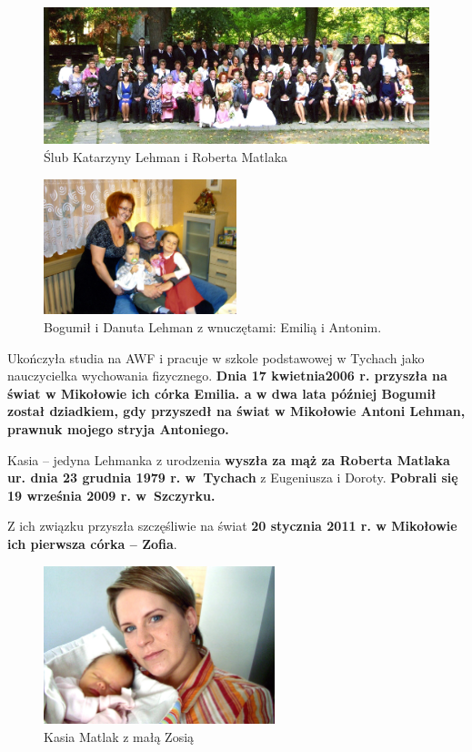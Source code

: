 \begin{figure}
\begin{center}
\includegraphics[width=240mm]{photo/katarzyna_robert_matlak_slub_2.jpg}
\caption{Ślub Katarzyny Lehman i Roberta Matlaka}
\end{center}
\end{figure}

\begin{figure}[!h]
\begin{center}
\includegraphics[width=0.5\textwidth]{photo/bogumil_danuta_lehman_z_wnukami.jpg}
\caption{Bogumił i Danuta Lehman z wnuczętami: Emilią i Antonim.}
\end{center}
\end{figure}



\newpage
Ukończyła studia na AWF i pracuje w szkole podstawowej w Tychach jako nauczycielka wychowania fizycznego. \textbf{Dnia 17 kwietnia2006 r. przyszła na świat w Mikołowie ich córka Emilia. a w dwa lata później Bogumił został dziadkiem, gdy przyszedł na świat w Mikołowie Antoni Lehman, prawnuk mojego stryja Antoniego.}

Kasia -- jedyna Lehmanka z urodzenia \textbf{wyszła za mąż za Roberta Matlaka ur. dnia 23 grudnia 1979 r. w~Tychach} z Eugeniusza i Doroty. \textbf{Pobrali się 19 września 2009 r. w~Szczyrku.}

Z ich związku przyszła szczęśliwie na świat \textbf{20 stycznia 2011 r. w Mikołowie ich pierwsza córka -- Zofia}.

\begin{figure}[!h]
\begin{center}
\includegraphics[width=0.6\textwidth]{photo/zofia_matlak.jpg}
\caption{Kasia Matlak z małą Zosią}
\end{center}
\end{figure}